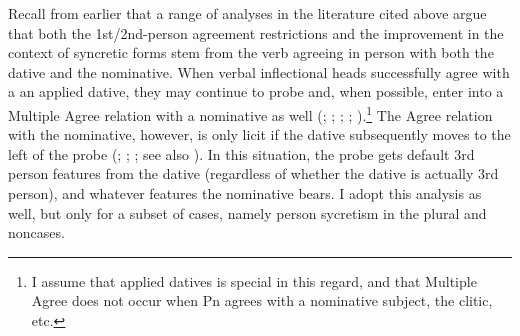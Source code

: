 \documentclass[output=paper,colorlinks,citecolor=brown,
]{langscibook}
\begin{document}





%





Recall from earlier that a range of analyses in the literature cited above argue that both the 1st/2nd-person agreement restrictions and the improvement in the context of syncretic forms stem from the verb agreeing in person with both the dative and the nominative.  When verbal inflectional heads successfully agree with a an applied dative, they may continue to probe and, when possible, enter into a Multiple Agree relation with a nominative as well (\citealt{Schutze:2003mh}; \citealt{SigurTHsson:2008dm}; \citealt{Ussery:2009jd}; \citealt{atlamaz2018partial}; \citealt{CoonKeine2020}).\footnote{I assume that applied datives is special in this regard, and that Multiple Agree does not occur when Pn agrees with a nominative subject, the \sti clitic, etc.}  The Agree relation with the nominative, however, is only licit if the dative subsequently moves to the left of the probe (\citealt{Holmberg:2004gk}; \citealt{Kucerova:2007nn,kucerova2016long}; \citealt{SigurTHsson:2008dm}; see also \citealt{Chomsky:2008od}). In this situation, the probe gets default 3rd person features from the dative (regardless of whether the dative is actually 3rd person), and whatever features the nominative bears. I adopt this analysis as well, but only for a subset of cases, namely person sycretism in the plural and non\sti cases.
\end{document}
